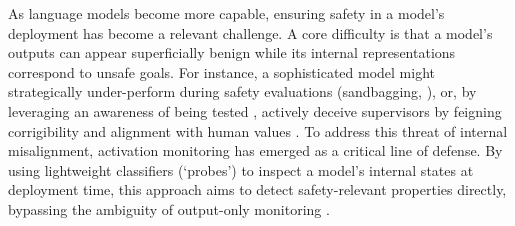 \documentclass{article} %
\begin{document}



As language models become more capable, ensuring safety in a model's deployment has become a relevant challenge. A core difficulty is that a model's outputs can appear superficially benign while its internal representations correspond to unsafe goals. For instance, a sophisticated model might strategically under-perform during safety evaluations (sandbagging, \citet{vanderweij2025aisandbagginglanguagemodels}), or, by leveraging an awareness of being tested \citep{abdelnabi2025linearcontroltestawareness, nguyen2025probingsteeringevaluationawareness}, actively deceive supervisors by feigning corrigibility and alignment with human values \citep{greenblatt2024alignmentfakinglargelanguage, meinke2025frontiermodelscapableincontext}. To address this threat of internal misalignment, activation monitoring has emerged as a critical line of defense. By using lightweight classifiers (`probes') to inspect a model's internal states at deployment time, this approach aims to detect safety-relevant properties directly, bypassing the ambiguity of output-only monitoring \citep{cunningham2025costeffective, shah2025approachtechnicalagisafety}.
\end{document}

